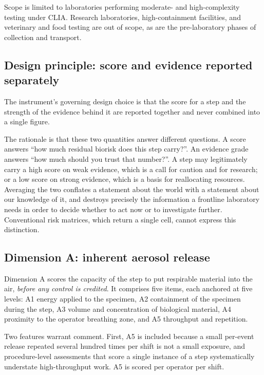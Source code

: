 Scope is limited to laboratories performing moderate- and high-complexity testing under
CLIA. Research laboratories, high-containment facilities, and veterinary and food testing
are out of scope, as are the pre-laboratory phases of collection and transport.

\subsection{Design principle: score and evidence reported separately}

The instrument's governing design choice is that the score for a step and the strength of
the evidence behind it are reported together and never combined into a single figure.

The rationale is that these two quantities answer different questions. A score answers
``how much residual biorisk does this step carry?''. An evidence grade answers ``how much
should you trust that number?''. A step may legitimately carry a high score on weak
evidence, which is a call for caution and for research; or a low score on strong evidence,
which is a basis for reallocating resources. Averaging the two conflates a statement about
the world with a statement about our knowledge of it, and destroys precisely the
information a frontline laboratory needs in order to decide whether to act now or to
investigate further. Conventional risk matrices, which return a single cell, cannot
express this distinction.

\subsection{Dimension A: inherent aerosol release}

Dimension A scores the capacity of the step to put respirable material into the air,
\emph{before any control is credited}. It comprises five items, each anchored at five
levels: A1 energy applied to the specimen, A2 containment of the specimen during the
step, A3 volume and concentration of biological material, A4 proximity to the operator
breathing zone, and A5 throughput and repetition.

Two features warrant comment. First, A5 is included because a small per-event release
repeated several hundred times per shift is not a small exposure, and procedure-level
assessments that score a single instance of a step systematically understate
high-throughput work. A5 is scored per operator per shift.

